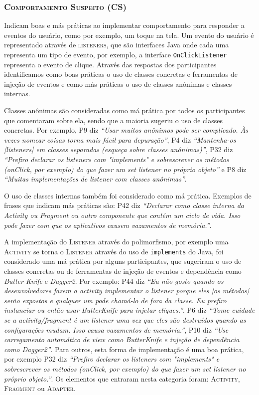 
\subsubsection{\textsc{Comportamento Suspeito (CS)}}
Indicam boas e más práticas ao implementar comportamento para responder a eventos do usuário, como por exemplo, um toque na tela. Um evento do usuário é representado através de \textsc{listeners}, que são interfaces Java onde cada uma representa um tipo de evento, por exemplo, a interface \texttt{OnClickListener} representa o evento de clique. Através das respostas dos participantes identificamos como boas práticas o uso de classes concretas e ferramentas de injeção de eventos e como más práticas o uso de classes anônimas e classes internas.

Classes anônimas são consideradas como má prática por todos os participantes que comentaram sobre ela, sendo que a maioria sugeriu o uso de classes concretas. Por exemplo, P9 diz \textit{``Usar muitos anônimos pode ser complicado. Às vezes nomear coisas torna mais fácil para depuração''}, P4 diz \textit{``Mantenha-os [listeners] em classes separadas (esqueça sobre classes anônimas)''}, P32 diz \textit{``Prefiro declarar os listeners com "implements" e sobrescrever os métodos (onClick, por exemplo) do que fazer um set listener no próprio objeto''} e P8 diz \textit{``Muitas implementações de listener com classes anônimas''}.

O uso de classes internas também foi considerado como má prática. Exemplos de frases que indicam más práticas são: P42 diz \textit{``Declarar como classe interna da Activity ou Fragment ou outro componente que contém um ciclo de vida. Isso pode fazer com que os aplicativos causem vazamentos de memória.''}.

A implementação do \textsc{Listener} através do polimorfismo, por exemplo uma \textsc{Activity} se torna o \textsc{Listener} através do uso de \texttt{implements} do Java, foi considerado uma má prática por alguns participantes, que sugeriram o uso de classes concretas ou de ferramentas de injeção de eventos e dependência como \textit{Butter Knife} \cite{ButterKnife} e \textit{Dagger2}. Por exemplo: P44 diz \textit{``Eu não gosto quando os desenvolvedores fazem a activity implementar o listener porque eles [os métodos] serão expostos e qualquer um pode chamá-lo de fora da classe. Eu prefiro instanciar ou então usar ButterKnife para injetar cliques.''}. P6 diz \textit{``Tome cuidade se a activity/fragment é um listener uma vez que eles são destruídos quando as configurações mudam. Isso causa vazamentos de memória.''}, P10 diz \textit{``Use carregamento automático de view como ButterKnife e injeção de dependência como Dagger2''}. Para outros, esta forma de implementação é uma boa prática, por exemplo P32 diz \textit{``Prefiro declarar os listeners com "implements" e sobrescrever os métodos (onClick, por exemplo) do que fazer um set listener no próprio objeto.''}. Os elementos que entraram nesta categoria foram: \textsc{Activity}, \textsc{Fragment} ou \textsc{Adapter}.

